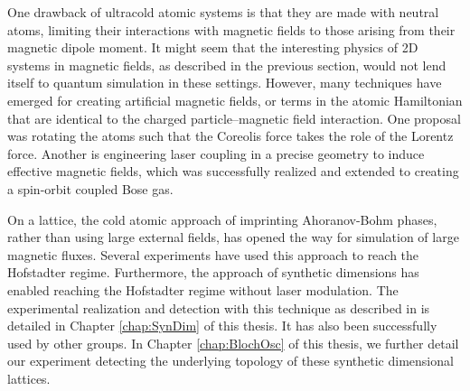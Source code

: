 One drawback of ultracold atomic systems is that they are made with neutral atoms, limiting their interactions with magnetic fields to those arising from their magnetic dipole moment. It might seem that the interesting physics of 2D systems in magnetic fields, as described in the previous section, would not lend itself to quantum simulation in these settings. However, many techniques have emerged for creating artificial magnetic fields, or terms in the atomic Hamiltonian that are identical to the charged particle--magnetic field interaction. One proposal was rotating the atoms such that the Coreolis force takes the role of the Lorentz force\cite{Cooper2008}. Another is engineering laser coupling in a precise geometry to induce effective magnetic fields\cite{Juzeliunas2006}, which was successfully realized\cite{Lin2009b} and extended to creating a spin-orbit coupled Bose gas\cite{Lin2011}. 

On a lattice, the cold atomic approach of imprinting Ahoranov-Bohm phases, rather than using large external fields, has opened the way for simulation of large magnetic fluxes\cite{Jaksch2003,Mueller2004,Sorensen2005}. Several experiments have used this approach to reach the Hofstadter regime\cite{Aidelsburger2013,Miyake2013,Jotzu2014,Aidelsburger2014,Mancini2015,An2017}. Furthermore, the approach of synthetic dimensions\cite{Celi2014} has enabled reaching the Hofstadter regime without laser modulation. The experimental realization and detection with this technique as described in\cite{Stuhl2015} is detailed in Chapter \ref{chap:SynDim} of this thesis. It has also been successfully used by other groups\cite{Mancini2015,Meier2016}. In Chapter \ref{chap:BlochOsc} of this thesis, we further detail our experiment detecting the underlying topology of these synthetic dimensional lattices. 

